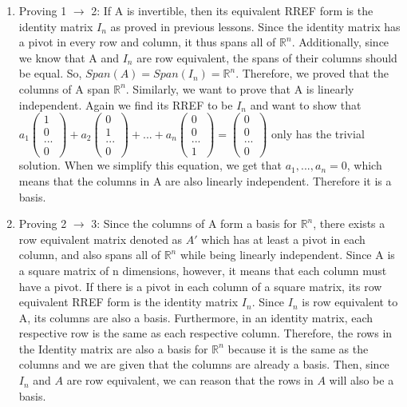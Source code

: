 \documentclass{article}
\begin{document}
\begin{enumerate}
\begin{enumerate}
\item Proving 1 $\rightarrow$ 2: If A is invertible, then its equivalent RREF form is the identity matrix $I_n$ as proved in previous lessons. Since the identity matrix has a pivot in every row and column, it thus spans all of $\mathbb{R}^n$. Additionally, since we know that A and $I_n$ are row equivalent, the spans of their columns should be equal. So, $Span(A) = Span(I_n) = \mathbb{R}^n$. Therefore, we proved that the columns of A span $\mathbb{R}^n$. Similarly, we want to prove that A is linearly independent. Again we find its RREF to be $I_n$ and want to show that \\ $a_1 \left(\begin{array}{c} 1 \\ 0 \\ ... \\ 0 \end{array}\right) + a_2 \left(\begin{array}{c} 0 \\ 1 \\ ... \\ 0 \end{array}\right) + ... + a_n \left(\begin{array}{c} 0 \\ 0 \\ ... \\ 1 \end{array}\right) =\left(\begin{array}{c} 0 \\ 0 \\ ... \\ 0 \end{array}\right) $ only has the trivial solution. When we simplify this equation, we get that $a_1,...,a_n = 0$, which means that the columns in A are also linearly independent. Therefore it is a basis.

\item Proving 2 $\rightarrow$ 3: Since the columns of A form a basis for $\mathbb{R}^n$, there exists a row equivalent matrix denoted as $A'$ which has at least a pivot in each column, and also spans all of  $\mathbb{R}^n$ while being linearly independent. Since A is a square matrix of n dimensions, however, it means that each column must have a pivot. If there is a pivot in each column of a square matrix, its row equivalent RREF form is the identity matrix $I_n$. Since $I_n$ is row equivalent to A, its columns are also a basis. Furthermore, in an identity matrix, each respective row is the same as each respective column. Therefore, the rows in the Identity matrix are also a basis for $\mathbb{R}^n$ because it is the same as the columns and we are given that the columns are already a basis. Then, since $I_n$ and $A$ are row equivalent, we can reason that the rows in $A$ will also be a basis.


\end{enumerate}
\end{enumerate}
\end{document}
